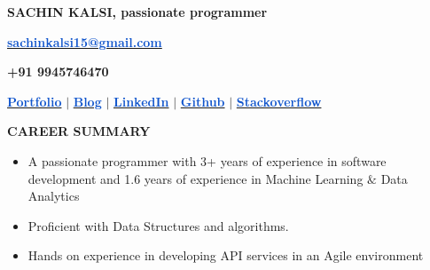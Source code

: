 \documentclass[12pt]{article}
\begin{document}
\setlength{\parskip}{5.04pt}
\begin{FlushLeft}
\textbf{SACHIN KALSI,  passionate programmer}
\end{FlushLeft}\par

\begin{FlushLeft}
\href{mailto:sachinkalsi15@gmail.com}{\textbf{\textcolor[HTML]{1155CC}{sachinkalsi15@gmail.com}}}
\end{FlushLeft}\par

\begin{FlushLeft}
\textbf{+91 9945746470}
\end{FlushLeft}\par

\begin{FlushRight}
\href{https://sachinkalsi.github.io/}{\textbf{\textcolor[HTML]{1155CC}{Portfolio}}} $ \vert $  \href{https://sachinkalsi.github.io/blog}{\textbf{\textcolor[HTML]{1155CC}{Blog}}} $ \vert $  \href{https://www.linkedin.com/in/sachinkalsi}{\textbf{\textcolor[HTML]{1155CC}{LinkedIn}}} $ \vert $ 
\href{https://github.com/sachinkalsi}{\textbf{\textcolor[HTML]{1155CC}{Github}}} $ \vert $ 
\href{https://stackoverflow.com/users/story/4467291}{\textbf{\textcolor[HTML]{1155CC}{Stackoverflow}}}
\end{FlushRight}\par


\vspace{\baselineskip}
\begin{FlushLeft}
{\fontsize{14pt}{16.8pt}\selectfont \textbf{CAREER SUMMARY}\par}
\end{FlushLeft}\par

\begin{itemize}
	\item A passionate programmer with 3+ years of experience in software development and 1.6 years of experience in Machine Learning $\&$  Data Analytics\par

	\item Proficient with Data Structures and algorithms.\par

	\item Hands on experience in developing API services in an Agile environment
\end{itemize}\par
\end{document}
